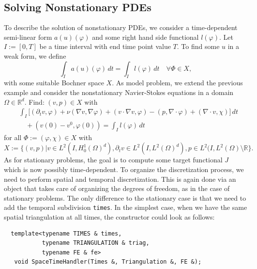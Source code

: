 \documentclass[smallextended]{svjour3}       %
\numberwithin{equation}{section}
\renewcommand{\phi}{\varphi}
\begin{document}
\subsection{Solving Nonstationary PDEs}\label{sec:timedep}
To describe the solution of nonstationary 
PDEs, we consider a time-dependent semi-linear form $a(u)(\phi)$ and some
right hand side functional $l(\phi)$.
Let $I:=[0,T]$ be a time interval with end time point value $T$.
To find some $u$ in a weak form, we define
\[
\int_I a(u)(\phi)\, dt = \int_I l(\phi)\, dt \quad \forall\Phi\in X,
\]
with some suitable Bochner space $X$.  As model problem,
we extend the previous example and consider the nonstationary Navier-Stokes equations
in a domain $\Omega\in\mathbb{R}^d$. Find: 
$(v,p)\in X$ with
\begin{align*}
&\int_I \bigl[ (\partial_t v, \phi)
+ \nu (\nabla v, \nabla \phi) + (v\cdot\nabla v, \phi)
- (p,\nabla\cdot \phi)
+ (\nabla\cdot v, \chi)\bigr] \, dt\\
&\quad + (v(0) - v^0, \phi(0))
= \int_I l(\phi) \, dt 
\end{align*}
for all $\Phi:= (\phi, \chi) \in X$ with
\[
X:= \bigl\{ 
(v,p) | v\in L^2(I,H_0^1(\Omega)^d) , 
\partial_t v\in L^2(I, L^2(\Omega)^d), 
p\in L^2(I,L^2(\Omega)\setminus\mathbb{R} \bigr\}.
\]
As for stationary problems, the goal is to compute
some target functional $J$ which is now possibly 
time-dependent. To organize the discretization 
process, we need to perform spatial and temporal 
discretization. This is again done via
an object that takes care of organizing the degrees of 
freedom, as in the case of stationary problems.
The only difference to the stationary case is that we need to 
add the temporal subdivision \texttt{times}. In the simplest 
case, when we have the same spatial triangulation 
at all times, the constructor could look as follows:
\begin{lstlisting}
  template<typename TIMES & times, 
           typename TRIANGULATION & triag, 
           typename FE & fe>
   void SpaceTimeHandler(Times &, Triangulation &, FE &);
\end{lstlisting}
\end{document}
